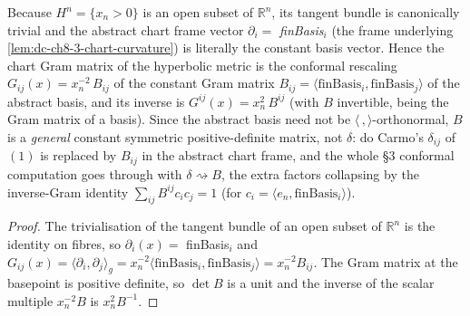 \begin{lemma}
  \label{lem:dc-ch8-3-hyperbolic-chart-gram}
  \leanok
  Because $H^n=\{x_n>0\}$ is an open subset of $\mathbb R^n$, its tangent bundle is
  canonically trivial and the abstract chart frame vector
  $\partial_i=$ \emph{finBasis}$_i$ (the frame underlying \cref{lem:dc-ch8-3-chart-curvature})
  is literally the constant basis vector. Hence the chart Gram matrix of the
  hyperbolic metric is the conformal rescaling
  $G_{ij}(x)=x_n^{-2}\,B_{ij}$ of the constant Gram matrix
  $B_{ij}=\langle\text{finBasis}_i,\text{finBasis}_j\rangle$ of the abstract basis,
  and its inverse is $G^{ij}(x)=x_n^{2}\,B^{ij}$ (with $B$ invertible, being the
  Gram matrix of a basis). Since the abstract basis need not be
  $\langle\,,\rangle$-orthonormal, $B$ is a \emph{general} constant symmetric
  positive-definite matrix, not $\delta$: do Carmo's $\delta_{ij}$ of $(1)$ is
  replaced by $B_{ij}$ in the abstract chart frame, and the whole §3 conformal
  computation goes through with $\delta\rightsquigarrow B$, the extra factors
  collapsing by the inverse-Gram identity $\sum_{ij}B^{ij}c_ic_j=1$ (for
  $c_i=\langle e_n,\text{finBasis}_i\rangle$).
\end{lemma}
\begin{proof}
  \leanok
  The trivialisation of the tangent bundle of an open subset of $\mathbb R^n$ is
  the identity on fibres, so $\partial_i(x)=$ finBasis$_i$ and
  $G_{ij}(x)=\langle\partial_i,\partial_j\rangle_g=x_n^{-2}\langle\text{finBasis}_i,\text{finBasis}_j\rangle=x_n^{-2}B_{ij}$.
  The Gram matrix at the basepoint is positive definite, so $\det B$ is a unit and
  the inverse of the scalar multiple $x_n^{-2}B$ is $x_n^{2}B^{-1}$.
\end{proof}

